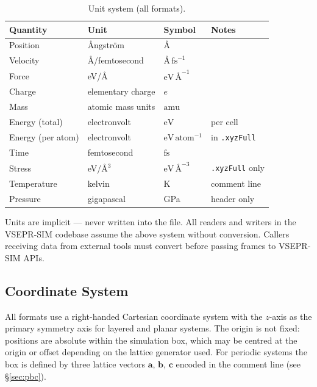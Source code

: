 \documentclass[11pt, a4paper, oneside]{article}
\newcommand{\ang}{\text{\AA}}
\newcommand{\fs}{\text{fs}}
\newcommand{\eV}{\text{eV}}
\newcommand{\amu}{\text{amu}}
\newcommand{\avec}{\mathbf{a}}
\newcommand{\bvec}{\mathbf{b}}
\newcommand{\cvec}{\mathbf{c}}
\begin{document}
\begin{table}[h]
\centering
\begin{tabular}{llll}
  \toprule
  Quantity & Unit & Symbol & Notes \\
  \midrule
  Position              & \AA ngstr\"{o}m      & $\ang$                 & \\
  Velocity              & \AA/femtosecond      & $\ang\,\fs^{-1}$       & \\
  Force                 & eV/\AA               & $\eV\,\ang^{-1}$       & \\
  Charge                & elementary charge    & $e$                    & \\
  Mass                  & atomic mass units    & $\amu$                 & \\
  Energy (total)        & electronvolt         & $\eV$                  & per cell \\
  Energy (per atom)     & electronvolt         & $\eV\,\text{atom}^{-1}$& in \texttt{.xyzFull} \\
  Time                  & femtosecond          & $\fs$                  & \\
  Stress                & eV/\AA$^3$           & $\eV\,\ang^{-3}$       & \texttt{.xyzFull} only \\
  Temperature           & kelvin               & K                      & comment line \\
  Pressure              & gigapascal           & GPa                    & header only \\
  \bottomrule
\end{tabular}
\caption{Unit system (all formats).}
\label{tab:units}
\end{table}

Units are implicit --- never written into the file. All readers and writers
in the VSEPR-SIM codebase assume the above system without conversion.
Callers receiving data from external tools must convert before passing
frames to VSEPR-SIM APIs.

\subsection{Coordinate System}
\label{sec:coords}

All formats use a right-handed Cartesian coordinate system with the
$z$-axis as the primary symmetry axis for layered and planar systems.
The origin is not fixed: positions are absolute within the simulation box,
which may be centred at the origin or offset depending on the lattice
generator used. For periodic systems the box is defined by three lattice
vectors $\avec$, $\bvec$, $\cvec$ encoded in the comment line
(see \S\ref{sec:pbc}).
\end{document}
